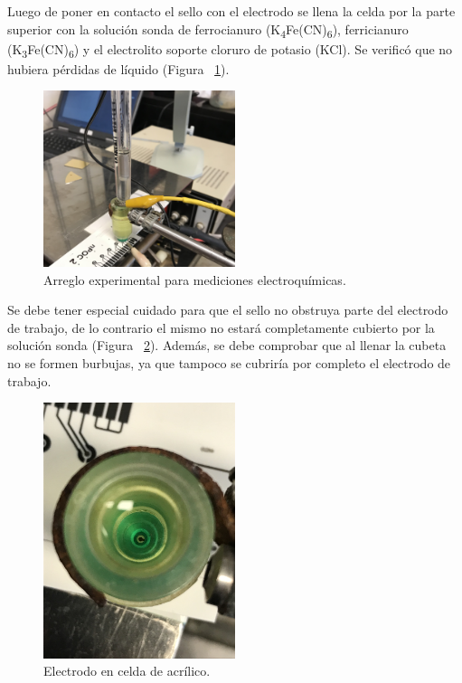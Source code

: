 Luego de poner en contacto el sello con el electrodo se llena la celda por la parte superior con la solución sonda de ferrocianuro (K\textsubscript{4}Fe(CN)\textsubscript{6}), ferricianuro (K\textsubscript{3}Fe(CN)\textsubscript{6}) y el electrolito soporte cloruro de potasio (KCl). Se verificó que no hubiera pérdidas de líquido (Figura ~\ref{fig:Figura_prueba_electroquimica}).

\begin{figure}[H]
  \centering
    \includegraphics[width=0.5\textwidth]{Figuras/Figura_prueba_electroquimica}
  \caption{Arreglo experimental para mediciones electroquímicas.}
  \label{fig:Figura_prueba_electroquimica}
\end{figure}

Se debe tener especial cuidado para que el sello no obstruya parte del electrodo de trabajo, de lo contrario el mismo no estará completamente cubierto por la solución sonda (Figura ~\ref{fig:Figura_electrodo_sonda}). Además, se debe comprobar que al llenar la cubeta no se formen burbujas, ya que tampoco se cubriría por completo el electrodo de trabajo.

\begin{figure}[H]
  \centering
    \includegraphics[width=0.5\textwidth]{Figuras/Figura_electrodo_sonda}
  \caption{Electrodo en celda de acrílico.}
  \label{fig:Figura_electrodo_sonda}
\end{figure}

